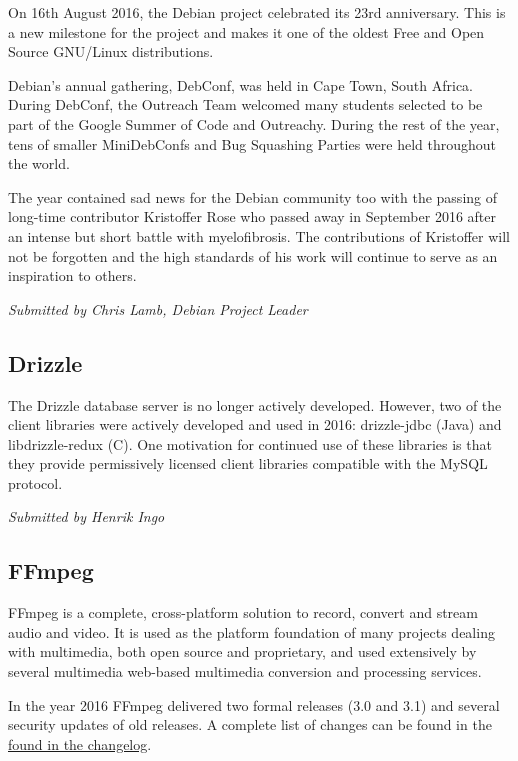 \documentclass[letterpaper]{report}
\begin{document}
On 16th August 2016, the Debian project celebrated its 23rd anniversary.
This is a new milestone for the project and makes it one of the oldest
Free and Open Source GNU/Linux distributions.

Debian's annual gathering, DebConf, was held in Cape Town, South Africa.
During DebConf, the Outreach Team welcomed many students selected to be
part of the Google Summer of Code and Outreachy. During the rest of the
year, tens of smaller MiniDebConfs and Bug Squashing Parties were held
throughout the world.

The year contained sad news for the Debian community too with the
passing of long-time contributor Kristoffer Rose who passed away in
September 2016 after an intense but short battle with myelofibrosis. The
contributions of Kristoffer will not be forgotten and the high standards
of his work will continue to serve as an inspiration to others.

{\em Submitted by Chris Lamb, Debian Project Leader}

\subsection{Drizzle}

The Drizzle database server is no longer actively developed. However,
two of the client libraries were actively developed and used in 2016:
drizzle-jdbc (Java) and libdrizzle-redux (C). One motivation for
continued use of these libraries is that they provide permissively
licensed client libraries compatible with the MySQL protocol.

{\em Submitted by Henrik Ingo}

\subsection{FFmpeg}

FFmpeg is a complete, cross-platform solution to record, convert and
stream audio and video. It is used as the platform foundation of many
projects dealing with multimedia, both open source and proprietary, and
used extensively by several multimedia web-based multimedia conversion
and processing services.

In the year 2016 FFmpeg delivered two formal releases (3.0 and 3.1) and
several security updates of old releases. A complete list of changes can
be found in the
\href{http://git.videolan.org/?p=ffmpeg.git;a=blob_plain;f=Changelog;hb=HEAD}{found
in the changelog}.
\end{document}
